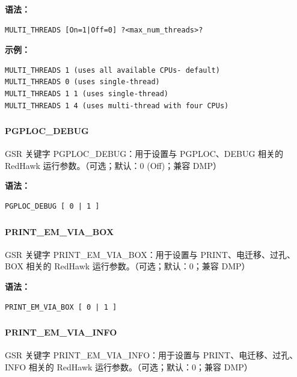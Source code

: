 \textbf{语法：}
\begin{lstlisting}
MULTI_THREADS [On=1|Off=0] ?<max_num_threads>?
\end{lstlisting}

\textbf{示例：}
\begin{lstlisting}
MULTI_THREADS 1 (uses all available CPUs- default)
MULTI_THREADS 0 (uses single-thread)
MULTI_THREADS 1 1 (uses single-thread)
MULTI_THREADS 1 4 (uses multi-thread with four CPUs)
\end{lstlisting}

\subsubsection{}
\paragraph*{PGPLOC_DEBUG}

GSR 关键字 PGPLOC_DEBUG：用于设置与 PGPLOC、DEBUG 相关的 RedHawk 运行参数。（可选；默认：0 (Off)；兼容 DMP）

\textbf{语法：}
\begin{lstlisting}
PGPLOC_DEBUG [ 0 | 1 ]
\end{lstlisting}

\subsubsection{}
\paragraph*{PRINT_EM_VIA_BOX}

GSR 关键字 PRINT_EM_VIA_BOX：用于设置与 PRINT、电迁移、过孔、BOX 相关的 RedHawk 运行参数。（可选；默认：0；兼容 DMP）

\textbf{语法：}
\begin{lstlisting}
PRINT_EM_VIA_BOX [ 0 | 1 ]
\end{lstlisting}

\subsubsection{}
\paragraph*{PRINT_EM_VIA_INFO}

GSR 关键字 PRINT_EM_VIA_INFO：用于设置与 PRINT、电迁移、过孔、INFO 相关的 RedHawk 运行参数。（可选；默认：0；兼容 DMP）

